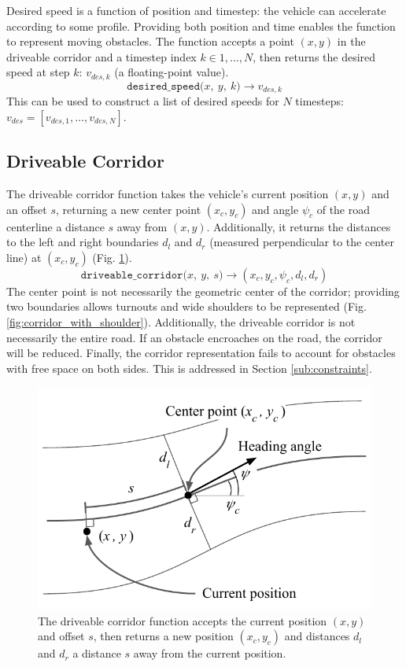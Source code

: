 \documentclass[letterpaper, 10 pt, conference]{ieeeconf}  %
\begin{document}
Desired speed is a function of position and timestep: the vehicle can accelerate according to some profile. Providing both position and time enables the function to represent moving obstacles.
The function accepts a point $(x, y)$ in the driveable corridor and a timestep index $k \in 1,\dots,N$, then returns the desired speed at step $k$: $v_{des,k}$ (a floating-point value).
%
$$\texttt{desired\_speed($x,\ y,\ k$)}\rightarrow v_{des,k}$$
This can be used to construct a list of desired speeds for $N$ timesteps: $v_{des} = [v_{des,1},\dots,v_{des,N}]$.



\subsection{Driveable Corridor} \label{sub:corridor}

The driveable corridor function takes the vehicle's current position $(x,y)$ and an offset $s$, returning a new center point $(x_c, y_c)$ and angle $\psi_c$ of the road centerline a distance $s$ away from $(x,y)$. Additionally, it returns the distances to the left and right boundaries $d_l$ and $d_r$ (measured perpendicular to the center line) at $(x_c, y_c)$ (Fig. \ref{fig:corridor}).
%
$$\texttt{driveable\_corridor($x,\ y,\ s$)} \rightarrow (x_c, y_c, \psi_c, d_l, d_r)$$
%
The center point is not necessarily the geometric center of the corridor; providing two boundaries allows turnouts and wide shoulders to be represented (Fig. \ref{fig:corridor_with_shoulder}). 
Additionally, the driveable corridor is not necessarily the entire road. If an obstacle encroaches on the road, the corridor will be reduced.
Finally, the corridor representation fails to account for obstacles with free space on both sides. This is addressed in Section \ref{sub:constraints}.


\begin{figure}[h]
	\centering
	\includegraphics[width=0.9\linewidth]{figures/corridor.pdf}
	\caption{The driveable corridor function accepts the current position $(x,y)$ and offset $s$, then returns a new position $(x_c, y_c)$ and distances $d_l$ and $d_r$ a distance $s$ away from the current position.}
	\label{fig:corridor}
\end{figure}
\end{document}
